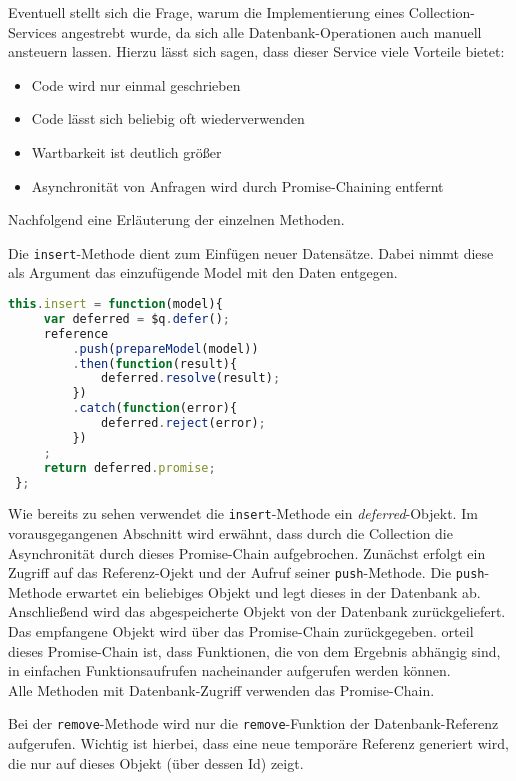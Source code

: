 Eventuell stellt sich die Frage, warum die Implementierung eines Collection-Services angestrebt wurde, da sich alle Datenbank-Operationen auch manuell ansteuern lassen. Hierzu lässt sich
sagen, dass dieser Service viele Vorteile bietet:
\begin{itemize}
\item{Code wird nur einmal geschrieben}
\item{Code lässt sich beliebig oft wiederverwenden}
\item{Wartbarkeit ist deutlich größer}
\item{Asynchronität von Anfragen wird durch Promise-Chaining entfernt}
\end{itemize}

Nachfolgend eine Erläuterung der einzelnen Methoden.

Die \texttt{insert}-Methode dient zum Einfügen neuer Datensätze. Dabei nimmt diese als Argument das einzufügende Model mit den Daten entgegen.
 \begin{lstlisting}[language=Javascript, label=code_CollectionInsert, caption=Insert-Methode einer Collection]
 this.insert = function(model){
     var deferred = $q.defer();
     reference
         .push(prepareModel(model))
         .then(function(result){
             deferred.resolve(result);
         })
         .catch(function(error){
             deferred.reject(error);
         })
     ;
     return deferred.promise;
 };
 \end{lstlisting}

 Wie bereits zu sehen verwendet die \texttt{insert}-Methode ein \textit{deferred}-Objekt. Im vorausgegangenen Abschnitt wird erwähnt, dass durch die Collection die Asynchronität durch dieses
 Promise-Chain aufgebrochen. Zunächst erfolgt ein Zugriff auf das Referenz-Ojekt und der Aufruf seiner \texttt{push}-Methode. Die \texttt{push}-Methode erwartet ein beliebiges Objekt
 und legt dieses in der Datenbank ab. Anschließend wird das abgespeicherte Objekt von der Datenbank zurückgeliefert.
 Das empfangene Objekt wird über das Promise-Chain zurückgegeben.
 orteil dieses Promise-Chain ist, dass Funktionen, die von dem Ergebnis abhängig sind, in einfachen Funktionsaufrufen nacheinander aufgerufen werden können.\\
 Alle Methoden mit Datenbank-Zugriff verwenden das Promise-Chain.

Bei der \texttt{remove}-Methode wird nur die \texttt{remove}-Funktion der Datenbank-Referenz aufgerufen. Wichtig ist hierbei, dass eine neue temporäre Referenz generiert wird, die nur
auf dieses Objekt (über dessen Id) zeigt.

